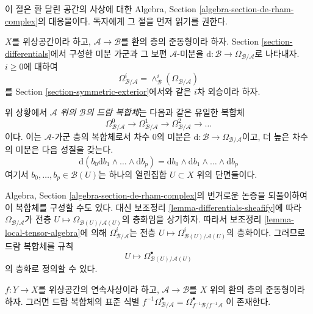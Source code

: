 \noindent
이 절은 환 달린 공간의 사상에 대한 Algebra, Section
\ref{algebra-section-de-rham-complex}의 대응물이다.
독자에게 그 절을 먼저 읽기를 권한다.

\medskip\noindent
$X$를 위상공간이라 하고, $\mathcal{A} \to \mathcal{B}$를 환의 층의
준동형이라 하자. Section \ref{section-differentials}에서 구성한
미분 가군과 그 보편 $\mathcal{A}$-미분을
$\text{d} : \mathcal{B} \to \Omega_{\mathcal{B}/\mathcal{A}}$로 나타내자.
$i \geq 0$에 대하여
$$
\Omega_{\mathcal{B}/\mathcal{A}}^i =
\wedge^i_\mathcal{B}(\Omega_{\mathcal{B}/\mathcal{A}})
$$
를 Section \ref{section-symmetric-exterior}에서와 같은 $i$차 외승이라 하자.

\begin{definition}
\label{definition-de-rham-complex}
위 상황에서 {\it $\mathcal{A}$ 위의 $\mathcal{B}$의 드람 복합체}는
다음과 같은 유일한 복합체
$$
\Omega_{\mathcal{B}/\mathcal{A}}^0 \to
\Omega_{\mathcal{B}/\mathcal{A}}^1 \to
\Omega_{\mathcal{B}/\mathcal{A}}^2 \to \ldots
$$
이다. 이는 $\mathcal{A}$-가군 층의 복합체로서 차수 $0$의 미분은
$\text{d} : \mathcal{B} \to \Omega_{\mathcal{B}/\mathcal{A}}$이고,
더 높은 차수의 미분은 다음 성질을 갖는다.
\begin{equation}
\label{equation-rule}
\text{d}\left(b_0\text{d}b_1 \wedge \ldots \wedge \text{d}b_p\right) =
\text{d}b_0 \wedge \text{d}b_1 \wedge \ldots \wedge \text{d}b_p
\end{equation}
여기서 $b_0, \ldots, b_p \in \mathcal{B}(U)$는 하나의 열린집합
$U \subset X$ 위의 단면들이다.
\end{definition}

\noindent
Algebra, Section \ref{algebra-section-de-rham-complex}의 번거로운 논증을
되풀이하여 이 복합체를 구성할 수도 있다. 대신 보조정리
\ref{lemma-differentials-sheafify}에 따라
$\Omega_{\mathcal{B}/\mathcal{A}}$가 전층
$U \mapsto \Omega_{\mathcal{B}(U)/\mathcal{A}(U)}$의 층화임을 상기하자.
따라서 보조정리 \ref{lemma-local-tensor-algebra}에 의해
$\Omega_{\mathcal{B}/\mathcal{A}}^i$는 전층
$U \mapsto \Omega^i_{\mathcal{B}(U)/\mathcal{A}(U)}$의 층화이다.
그러므로 드람 복합체를 규칙
$$
U \longmapsto
\Omega^\bullet_{\mathcal{B}(U)/\mathcal{A}(U)}
$$
의 층화로 정의할 수 있다.

\begin{lemma}
\label{lemma-pullback-de-rham-complex}
$f : Y \to X$를 위상공간의 연속사상이라 하고,
$\mathcal{A} \to \mathcal{B}$를 $X$ 위의 환의 층의 준동형이라 하자.
그러면 드람 복합체의 표준 식별
$f^{-1}\Omega^\bullet_{\mathcal{B}/\mathcal{A}} =
\Omega^\bullet_{f^{-1}\mathcal{B}/f^{-1}\mathcal{A}}$
이 존재한다.
\end{lemma}

